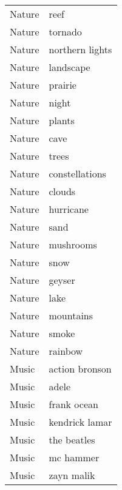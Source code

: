 \begin{supertabular}{l p{0.25\textwidth}}
           Nature &                               reef \\
           Nature &                            tornado \\
           Nature &                    northern lights \\
           Nature &                          landscape \\
           Nature &                            prairie \\
           Nature &                              night \\
           Nature &                             plants \\
           Nature &                               cave \\
           Nature &                              trees \\
           Nature &                     constellations \\
           Nature &                             clouds \\
           Nature &                          hurricane \\
           Nature &                               sand \\
           Nature &                          mushrooms \\
           Nature &                               snow \\
           Nature &                             geyser \\
           Nature &                               lake \\
           Nature &                          mountains \\
           Nature &                              smoke \\
           Nature &                            rainbow \\
            Music &                     action bronson \\
            Music &                              adele \\
            Music &                        frank ocean \\
            Music &                     kendrick lamar \\
            Music &                        the beatles \\
            Music &                          mc hammer \\
            Music &                         zayn malik \\

\end{supertabular}
